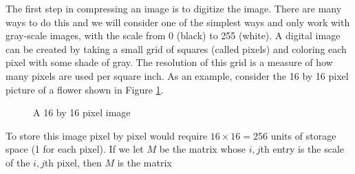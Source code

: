 The first step in compressing an image is to digitize the image. There are many ways to do this and we will consider one of the simplest ways and only work with gray-scale images, with the scale from 0 (black) to 255 (white).  A digital image can be created by taking a small grid of squares (called pixels) and coloring each pixel with some shade of gray.  The resolution of this grid is a measure of how many pixels are used per square inch.  As an example,  consider the 16 by 16 pixel picture of a flower shown in Figure \ref{Fig:7_c_Flower}.
\begin{figure}[h]
\begin{center}
\end{center}
\caption{A 16 by 16 pixel image}
\label{Fig:7_c_Flower}
\end{figure}

To store this image pixel by pixel would require $16 \times 16 = 256$ units of storage space (1 for each pixel). If we let $M$ be the matrix whose $i,j$th entry is the scale of the $i,j$th pixel, then $M$ is the matrix 

